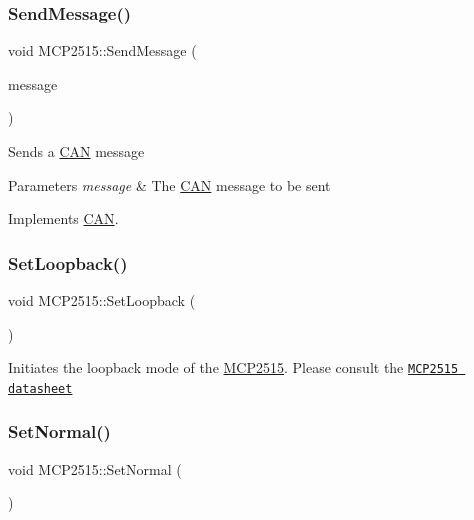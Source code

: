 \subsubsection{\texorpdfstring{Send\+Message()}{SendMessage()}}
{\footnotesize\ttfamily void M\+C\+P2515\+::\+Send\+Message (\begin{DoxyParamCaption}\item[{\hyperlink{struct_can_message}{Can\+Message} \&}]{message }\end{DoxyParamCaption})\hspace{0.3cm}{\ttfamily [virtual]}}

Sends a \hyperlink{class_c_a_n}{C\+AN} message 
\begin{DoxyParams}{Parameters}
{\em message} & The \hyperlink{class_c_a_n}{C\+AN} message to be sent \\
\hline
\end{DoxyParams}


Implements \hyperlink{class_c_a_n_a6d9cf7beee73adaaa0be93426a078612}{C\+AN}.

\hypertarget{class_m_c_p2515_a7aac5fdb713b83933391348f1188f2b9}{}\label{class_m_c_p2515_a7aac5fdb713b83933391348f1188f2b9} 
\subsubsection{\texorpdfstring{Set\+Loopback()}{SetLoopback()}}
{\footnotesize\ttfamily void M\+C\+P2515\+::\+Set\+Loopback (\begin{DoxyParamCaption}{ }\end{DoxyParamCaption})}

Initiates the loopback mode of the \hyperlink{class_m_c_p2515}{M\+C\+P2515}. Please consult the \href{http://ww1.microchip.com/downloads/en/DeviceDoc/21801G.pdf}{\tt M\+C\+P2515 datasheet} \hypertarget{class_m_c_p2515_a58601a9d30863ebac441d641ddfac44e}{}\label{class_m_c_p2515_a58601a9d30863ebac441d641ddfac44e} 
\subsubsection{\texorpdfstring{Set\+Normal()}{SetNormal()}}
{\footnotesize\ttfamily void M\+C\+P2515\+::\+Set\+Normal (\begin{DoxyParamCaption}{ }\end{DoxyParamCaption})}

